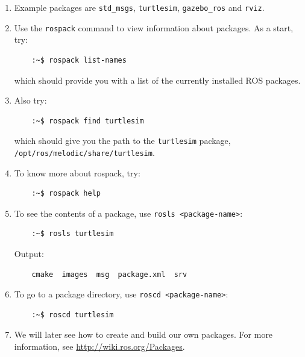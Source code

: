 \documentclass{article}
\begin{document}
\begin{enumerate}
                \item Example packages are \texttt{std\_msgs}, \texttt{turtlesim}, \texttt{gazebo\_ros} and \texttt{rviz}.
                \item Use the \texttt{rospack} command to view information about packages. As a start, try:
                \begin{verbatim}
    :~$ rospack list-names
                \end{verbatim}
                which should provide you with a list of the currently installed ROS packages.
                \item Also try:
                \begin{verbatim}
    :~$ rospack find turtlesim
                \end{verbatim}
                which should give you the path to the \texttt{turtlesim} package, \texttt{/opt/ros/melodic/share/turtlesim}.
                \item To know more about rospack, try:
                \begin{verbatim}
    :~$ rospack help
                \end{verbatim}
                \item To see the contents of a package, use \texttt{rosls <package-name>}:
                \begin{verbatim}
    :~$ rosls turtlesim
                \end{verbatim}
                Output:
                \begin{verbatim}
    cmake  images  msg  package.xml  srv
                \end{verbatim}
                \item To go to a package directory, use \texttt{roscd <package-name>}:
                \begin{verbatim}
    :~$ roscd turtlesim
                \end{verbatim}
                \item We will later see how to create and build our own packages. For more information, see \url{http://wiki.ros.org/Packages}.
            \end{enumerate}
\end{document}
